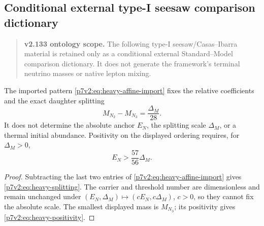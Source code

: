 \documentclass[11pt,a4paper]{article}
\begin{document}
\label{p7v2:part:heavy-thermal}

\subsection{Conditional external type-I seesaw comparison dictionary}
\label{p7v2:sec:heavy-seesaw}
\begin{quote}\textbf{v2.133 ontology scope.} The following type-I seesaw/Casas--Ibarra material is retained only as a conditional external Standard--Model comparison dictionary. It does not generate the framework's terminal neutrino masses or native lepton mixing.\end{quote}

\begin{proposition}
\label{p7v2:prop:heavy-affine-status}
The imported pattern \eqref{p7v2:eq:heavy-affine-import} fixes the relative
coefficients and the exact daughter splitting
\begin{equation}
\label{p7v2:eq:heavy-splitting}
 M_{N_2}-M_{N_3}=\frac{\Delta_M}{28}.
\end{equation}
It does not determine the absolute anchor \(E_N\), the splitting scale
\(\Delta_M\), or a thermal initial abundance.  Positivity on the displayed
ordering requires, for \(\Delta_M>0\),
\begin{equation}
\label{p7v2:eq:heavy-positivity}
 E_N>\frac{57}{56}\Delta_M.
\end{equation}
\end{proposition}

\begin{proof}
Subtracting the last two entries of
\eqref{p7v2:eq:heavy-affine-import} gives
\eqref{p7v2:eq:heavy-splitting}.  The carrier and threshold number are
dimensionless and remain unchanged under
\((E_N,\Delta_M)\mapsto(cE_N,c\Delta_M)\), \(c>0\), so they cannot fix the
absolute scale.  The smallest displayed mass is \(M_{N_3}\); its positivity
gives \eqref{p7v2:eq:heavy-positivity}.
\end{proof}
\end{document}
